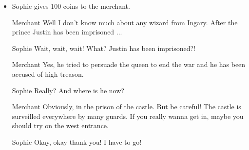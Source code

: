 \begin{itemize}
\begin{itemize}
\begin{screenplay}

\begin{dialogue}[annoyed]{Merchant}
It’s not enough. Don’t waste my time!\\
\end{dialogue}

    Sophie goes away disconsolate.
    
\begin{dialogue}{Sophie}
I saw on the map there is another square in front of the castle, maybe we'll have better luck there.
\end{dialogue}

\end{screenplay}

  \item Sophie gives 100 coins to the merchant.
    
\begin{screenplay}

\begin{dialogue}{Merchant}
Well I don't know much about any wizard from Ingary. After the prince Justin has been imprisoned ...
\end{dialogue}

\begin{dialogue}[incredulous]{Sophie}
Wait, wait, wait! What? Justin has been imprisoned?!
\end{dialogue}
    
\begin{dialogue}{Merchant}
Yes, he tried to persuade the queen to end the war and he has been accused of high treason.
\end{dialogue}
    
\begin{dialogue}{Sophie}
Really? And where is he now?
\end{dialogue}
    
\begin{dialogue}{Merchant}
Obviously, in the prison of the castle. But be careful! The castle is surveilled everywhere by many guards. If you really wanna get in, maybe you should try on the west entrance. %
\end{dialogue}
    
\begin{dialogue}[hasty]{Sophie}
Okay, okay thank you! I have to go!
\end{dialogue}

\end{screenplay}

  \end{itemize}

\end{itemize}

